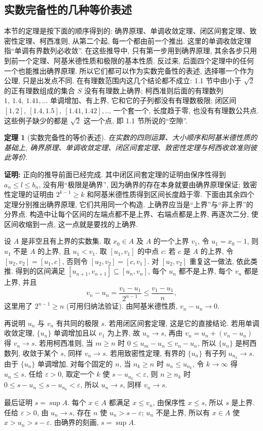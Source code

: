 \documentclass[UTF8,openany]{ctexbook}
\theoremstyle{chinesetextbook}
\newtheorem{theorem}{定理}[section]
\newenvironment{cnproof}{\par\indent\textbf{证明:} \ignorespaces}{\par}
\begin{document}
\subsection{实数完备性的几种等价表述}
本节的定理是按下面的顺序得到的: 确界原理、单调收敛定理、闭区间套定理、致密性定理、柯西准则, 从第二个起, 每一个都由前一个推出. 这里的单调收敛定理指“单调有界数列必收敛”. 在这些推导中, 只有第一步用到确界原理, 其余各步只用到前一个定理、阿基米德性质和极限的基本性质. 反过来, 后面四个定理中的任何一个也能推出确界原理. 所以它们都可以作为实数完备性的表述, 选择哪一个作为公理, 只是出发点不同. 在有理数范围内这几个结论都不成立: 1.1 节中由小于 $\sqrt2$ 的正有理数组成的集合 $S$ 没有有理数上确界; 柯西准则后面的有理数列 $1,\ 1.4,\ 1.41,\ldots$ 单调增加、有上界, 它和它的子列都没有有理数极限; 闭区间 $[1,2],\ [1.4,1.5],\ [1.41,1.42],\ldots$ 一个套一个, 长度趋于零, 也没有有理数公共点. 这些例子缺少的都是 $\sqrt2$ 这一个点, 即 1.1 节所说的“空隙”.
\begin{theorem}[实数完备性的等价表述]
在实数的四则运算、大小顺序和阿基米德性质的基础上, 确界原理、单调收敛定理、闭区间套定理、致密性定理与柯西收敛准则彼此等价.
\end{theorem}
\begin{cnproof}
正向的推导前面已经完成. 其中闭区间套定理的证明由保序性得到 $a_n\le l\le b_n$, 没有用“极限是确界”, 因为确界的存在本身就要由确界原理保证; 致密性定理的证明由 $2^{k-1}\ge k$ 和阿基米德性质得到区间长度趋于零. 下面由其余四个定理分别推出确界原理, 它们共用同一个构造. 上确界应当是“上界”与“非上界”的分界点. 构造中让每个区间的左端点都不是上界、右端点都是上界, 再逐次二分, 使区间收缩到一点, 这一点就是要找的上确界.

设 $A$ 是非空且有上界的实数集. 取 $x_0\in A$ 及 $A$ 的一个上界 $v_1$, 令 $u_1=x_0-1$, 则 $u_1$ 不是 $A$ 的上界, 且 $u_1<v_1$. 取 $[u_1,v_1]$ 的中点 $c$: 若 $c$ 是 $A$ 的上界, 令 $[u_2,v_2]=[u_1,c]$, 否则令 $[u_2,v_2]=[c,v_1]$. 对 $[u_2,v_2]$ 重复这一做法, 依此类推. 得到的区间满足 $[u_{n+1},v_{n+1}]\subseteq[u_n,v_n]$, 每个 $u_n$ 都不是上界, 每个 $v_n$ 都是上界, 并且
\[
v_n-u_n=\frac{v_1-u_1}{2^{n-1}}\le\frac{v_1-u_1}n,
\]
这里用了 $2^{n-1}\ge n$ (可用归纳法验证). 由阿基米德性质, $v_n-u_n\to0$.

再说明 $u_n$ 与 $v_n$ 有共同的极限 $s$. 若用闭区间套定理, 这是它的直接结论. 若用单调收敛定理, $\{u_n\}$ 单调增加且以 $v_1$ 为上界, 故 $u_n\to s$, 再由 $v_n=u_n+(v_n-u_n)$ 得 $v_n\to s$. 若用柯西准则, 当 $m\ge n$ 时 $0\le u_m-u_n\le v_n-u_n$, 所以 $\{u_n\}$ 是柯西数列, 收敛于某个 $s$, 同样 $v_n\to s$. 若用致密性定理, 有界的 $\{u_n\}$ 有子列 $u_{n_k}\to s$. 由于 $\{u_n\}$ 单调增加, 对每个固定的 $n$, 当 $n_k\ge n$ 时 $u_n\le u_{n_k}$, 令 $k\to\infty$ 得 $u_n\le s$. 任给 $\varepsilon>0$, 取定一个 $k$ 使 $s-u_{n_k}<\varepsilon$, 则 $n\ge n_k$ 时 $0\le s-u_n\le s-u_{n_k}<\varepsilon$, 所以 $u_n\to s$, 同样 $v_n\to s$.

最后证明 $s=\sup A$. 每个 $x\in A$ 都满足 $x\le v_n$, 由保序性 $x\le s$, 所以 $s$ 是上界. 任给 $\varepsilon>0$, 由 $u_n\to s$, 存在 $n$ 使 $u_n>s-\varepsilon$; $u_n$ 不是上界, 所以有 $x\in A$ 使 $x>u_n>s-\varepsilon$. 由确界的刻画, $s=\sup A$.
\end{cnproof}
\end{document}
